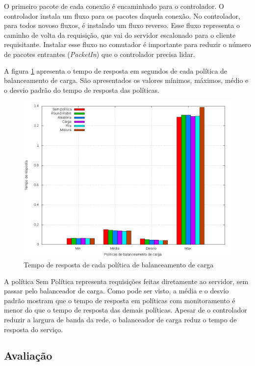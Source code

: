 O primeiro pacote de cada conexão é encaminhado para o controlador.
O controlador instala um fluxo para os pacotes daquela conexão.
No controlador, para todos novoso fluxos, é instalado um fluxo reverso.
Esse fluxo representa o caminho de volta da requisição, que vai do servidor
escalonado para o cliente requisitante.
Instalar esse fluxo no comutador é importante para reduzir o número de 
pacotes entrantes (\emph{PacketIn}) que o controlador precisa lidar.

A figura \ref{fig:balancer-http-times} apresenta o tempo de resposta em segundos
de cada política de balanceamento de carga.
São apresentados os valores mínimos, máximos, médio e o desvio padrão do 
tempo de resposta das políticas.

\begin{figure}[htb!]
    \centering
    \includegraphics[width=\linewidth]{img/balancer-http-times}
    \caption{Tempo de resposta de cada política de balanceamento de carga}
    \label{fig:balancer-http-times}
\end{figure}

A política Sem Política representa requisições feitas diretamente ao servidor, 
sem passar pelo balanceador de carga.
Como pode ser visto, a média e o desvio padrão mostram que o tempo de resposta
em políticas com monitoramento é menor do que o tempo de resposta das demais
políticas.
Apesar de o controlador reduzir a largura de banda da rede, o balanceador 
de carga reduz o tempo de resposta do serviço.

\subsection{Avaliação}

